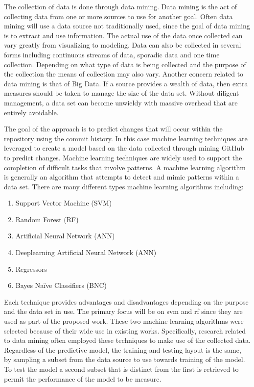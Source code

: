 The collection of data is done through data mining. Data mining is the act of collecting data from one or more sources to use for another goal. Often data mining will use a data source not traditionally used, since the goal of data mining is to extract and use information. The actual use of the data once collected can vary greatly from visualizing to modeling. Data can also be collected in several forms including continuous streams of data, sporadic data and one time collection. Depending on what type of data is being collected and the purpose of the collection the means of collection may also vary. Another concern related to data mining is that of Big Data. If a source provides a wealth of data, then extra measures should be taken to manage the size of the data set. Without diligent management, a data set can become unwieldy with massive overhead that are entirely avoidable.

The goal of the approach is to predict changes that will occur within the repository using the commit history. In this case machine learning techniques are leveraged to create a model based on the data collected through mining GitHub to predict changes. Machine learning techniques are widely used to support the completion of difficult tasks that involve patterns. A machine learning algorithm is generally an algorithm that attempts to detect and mimic patterns within a data set. There are many different types machine learning algorithms including:

\begin{enumerate}
\item Support Vector Machine (SVM)
\item Random Forest (RF)
\item Artificial Neural Network (ANN)
\item Deeplearning Artificial Neural Network (ANN)
\item Regressors
\item Bayes Na{\"i}ve Classifiers (BNC)
\end{enumerate}

Each technique provides advantages and disadvantages depending on the purpose and the data set in use. The primary focus will be on \gls{svm} and \gls{rf} since they are used as part of the proposed work. These two machine learning algorithms were selected because of their wide use in existing works. Specifically, research related to data mining often employed these techniques to make use of the collected data. Regardless of the predictive model, the training and testing layout is the same, by sampling a subset from the data source to use towards training of the model. To test the model a second subset that is distinct from the first is retrieved to permit the performance of the model to be measure.

